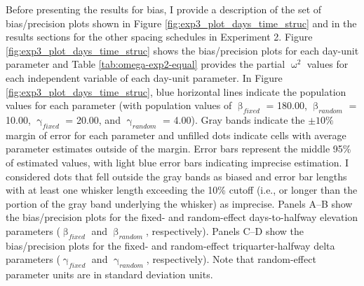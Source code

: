 \documentclass[
12pt, %
twoside,
english]{guelphthesis}
\begin{document}
Before presenting the results for bias, I provide a description of the set of bias/precision plots shown in Figure \ref{fig:exp3_plot_days_time_struc} and in the results sections for the other spacing schedules in Experiment 2. Figure \ref{fig:exp3_plot_days_time_struc} shows the bias/precision plots for each day-unit parameter and Table \ref{tab:omega-exp2-equal} provides the partial \(\upomega^2\) values for each independent variable of each day-unit parameter. In Figure \ref{fig:exp3_plot_days_time_struc}, blue horizontal lines indicate the population values for each parameter (with population values of \(\upbeta_{fixed}\) = 180.00, \(\upbeta_{random}\) = 10.00, \(\upgamma_{fixed}\) = 20.00, and \(\upgamma_{random}\) = 4.00). Gray bands indicate the \(\pm 10\%\) margin of error for each parameter and unfilled dots indicate cells with average parameter estimates outside of the margin. Error bars represent the middle 95\% of estimated values, with light blue error bars indicating imprecise estimation. I considered dots that fell outside the gray bands as biased and error bar lengths with at least one whisker length exceeding the 10\% cutoff (i.e., or longer than the portion of the gray band underlying the whisker) as imprecise. Panels A--B show the bias/precision plots for the fixed- and random-effect days-to-halfway elevation parameters (\(\upbeta_{fixed}\) and \(\upbeta_{random}\), respectively). Panels C--D show the bias/precision plots for the fixed- and random-effect triquarter-halfway delta parameters (\(\upgamma_{fixed}\) and \(\upgamma_{random}\), respectively). Note that random-effect parameter units are in standard deviation units.
\end{document}
